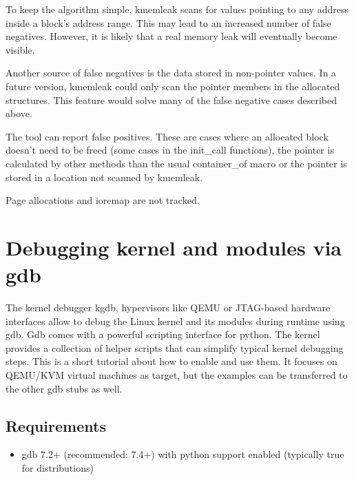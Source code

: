 \documentclass[a4paper,8pt,english]{sphinxmanual}
\begin{document}
To keep the algorithm simple, kmemleak scans for values pointing to any
address inside a block's address range. This may lead to an increased
number of false negatives. However, it is likely that a real memory leak
will eventually become visible.

Another source of false negatives is the data stored in non-pointer
values. In a future version, kmemleak could only scan the pointer
members in the allocated structures. This feature would solve many of
the false negative cases described above.

The tool can report false positives. These are cases where an allocated
block doesn't need to be freed (some cases in the init\_call functions),
the pointer is calculated by other methods than the usual container\_of
macro or the pointer is stored in a location not scanned by kmemleak.

Page allocations and ioremap are not tracked.


\chapter{Debugging kernel and modules via gdb}
\label{dev-tools/gdb-kernel-debugging::doc}\label{dev-tools/gdb-kernel-debugging:debugging-kernel-and-modules-via-gdb}
The kernel debugger kgdb, hypervisors like QEMU or JTAG-based hardware
interfaces allow to debug the Linux kernel and its modules during runtime
using gdb. Gdb comes with a powerful scripting interface for python. The
kernel provides a collection of helper scripts that can simplify typical
kernel debugging steps. This is a short tutorial about how to enable and use
them. It focuses on QEMU/KVM virtual machines as target, but the examples can
be transferred to the other gdb stubs as well.


\section{Requirements}
\label{dev-tools/gdb-kernel-debugging:requirements}\begin{itemize}
\item {} 
gdb 7.2+ (recommended: 7.4+) with python support enabled (typically true
for distributions)

\end{itemize}
\end{document}
